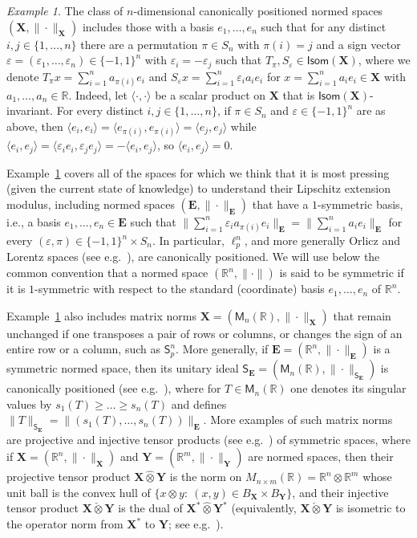\documentclass[11pt,reqno]{amsart}
\renewcommand{\ge}{\geqslant}
\newcommand{\n}{\{1,\ldots,n\}}
\newcommand{\X}{\mathbf X}
\newcommand{\Y}{\mathbf Y}
\newcommand{\e}{\varepsilon}
\newcommand{\R}{\mathbb R}
\theoremstyle{remark}
\newtheorem{example}[theorem]{Example}
\newcommand{\M}{\mathsf{M}}
\newcommand{\sfS}{\mathsf{S}}
\renewcommand{\1}{\mathbf 1}
\newcommand{\tp}{\hat{\otimes}}
\newcommand{\ti}{\check{\otimes}}
\begin{document}
\begin{example}\label{ex permutation and sign}
The class of $n$-dimensional canonically positioned normed spaces $(\X,\|\cdot\|_\X)$ includes   those with a basis $e_1,\ldots,e_n$ such that for any distinct $i,j\in \n$ there are a permutation $\pi\in S_n$ with $\pi(i)=j$ and a sign vector $\e=(\e_1,\ldots,\e_n)\in \{-1,1\}^n$ with $\e_i=-\e_j$ such that $T_\pi,S_\e\in \mathsf{Isom}(\X)$, where we denote $T_\pi x= \sum_{i=1}^na_{\pi(i)}e_i$ and $S_\e x=\sum_{i=1}^n \e_i a_i e_i$ for  $x=\sum_{i=1}^n a_ie_i\in \X$ with $a_1,\ldots,a_n\in \R$. Indeed, let $\langle\cdot,\cdot\rangle$ be a scalar product on $\X$ that is $\mathsf{Isom}(\X)$-invariant. For every distinct $i,j\in \n$, if $\pi\in S_n$ and $\e\in \{-1,1\}^n$ are as above, then $\langle e_i,e_i\rangle=\langle e_{\pi(i)},e_{\pi(i)}\rangle =\langle e_j,e_j\rangle$ while $\langle e_i,e_j\rangle =\langle \e_i e_i,\e_j e_j\rangle =-\langle e_i,e_j\rangle$, so $\langle e_i,e_j\rangle=0$.
\end{example}


Example~\ref{ex permutation and sign} covers all of the spaces for which we think that it is most pressing (given the current state of  knowledge) to understand their Lipschitz extension modulus, including normed spaces $(\mathbf{E},\|\cdot\|_{\mathbf{E}})$ that have a $1$-symmetric basis, i.e., a basis $e_1,\ldots,e_n\in \mathbf{E}$  such that $\|\sum_{i=1}^n \e_ia_{\pi(i)}e_i\|_\mathbf{E}=\|\sum_{i=1}^n a_ie_i\|_\mathbf{E}$ for every $(\e,\pi)\in \{-1,1\}^n\times S_n$. In particular, $\ell_p^n$, and more generally Orlicz and Lorentz spaces (see e.g.~\cite{LT77}), are canonically positioned. We will use below the common convention that a normed space $(\R^n,\|\cdot\|)$ is said to be symmetric if it is $1$-symmetric with respect to the standard (coordinate) basis $e_1,\ldots,e_n$ of $\R^n$.

Example~\ref{ex permutation and sign} also includes matrix norms $\X=(\M_n(\R),\|\cdot\|_\X)$ that remain unchanged if one transposes a pair of rows or columns, or changes the sign of an entire row or a column, such as  $\sfS_p^n$. More generally, if $\mathbf{E}=(\R^n,\|\cdot\|_{\mathbf{E}})$ is a symmetric normed space, then its  unitary  ideal $\sfS_{\mathbf{E}}=(\M_n(\R),\|\cdot\|_{\sfS_\mathbf{E}})$ is canonically positioned (see e.g.~\cite{Bha97}), where   for $T\in \M_n(\R)$ one denotes its singular values by $s_1(T)\ge\ldots \ge s_n(T)$ and defines  $\|T\|_{\sfS_\mathbf{E}}=\|(s_1(T),\ldots,s_n(T))\|_{\mathbf{E}}$. More examples of such matrix norms are projective and injective tensor products (see e.g.~\cite{Rya02}) of symmetric spaces, where if $\X=(\R^n,\|\cdot\|_\X)$ and $\Y=(\R^m,\|\cdot\|_\Y)$ are normed spaces, then their projective tensor product $\X\tp \Y$ is the norm on $M_{n\times m}(\R)=\R^n\otimes \R^m$ whose unit ball is the convex hull of $\{x\otimes y:\ (x,y)\in B_\X\times B_\Y\}$, and their injective tensor product $\X\ti \Y$ is the dual of $\X^*\!\tp \Y^*$ (equivalently, $\X\ti \Y$ is isometric to the operator norm from $\X^*$ to $\Y$; see e.g.~\cite[Section~1.1]{DFS08}).
\end{document}
